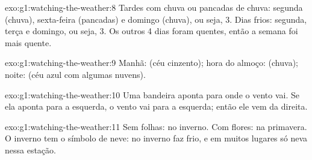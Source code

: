 \begin{solution}{exo:g1:watching-the-weather:8}
Tardes com chuva ou pancadas de chuva: segunda (chuva), sexta-feira (pancadas) e domingo
(chuva), ou seja, 3. Dias frios: segunda, terça e domingo, ou seja, 3. Os
outros 4 dias foram quentes, então a semana foi mais quente.
\end{solution}

\begin{solution}{exo:g1:watching-the-weather:9}
Manhã:  (céu cinzento); hora do almoço:  (chuva);
noite:  (céu azul com algumas nuvens).
\end{solution}

\begin{solution}{exo:g1:watching-the-weather:10}
Uma bandeira aponta para onde o vento vai. Se ela aponta para a esquerda,
o vento vai para a esquerda; então ele vem da direita.
\end{solution}

\begin{solution}{exo:g1:watching-the-weather:11}
Sem folhas: no inverno. Com flores: na primavera. O inverno tem o símbolo
de neve: no inverno faz frio, e em muitos lugares só neva nessa estação.
\end{solution}

